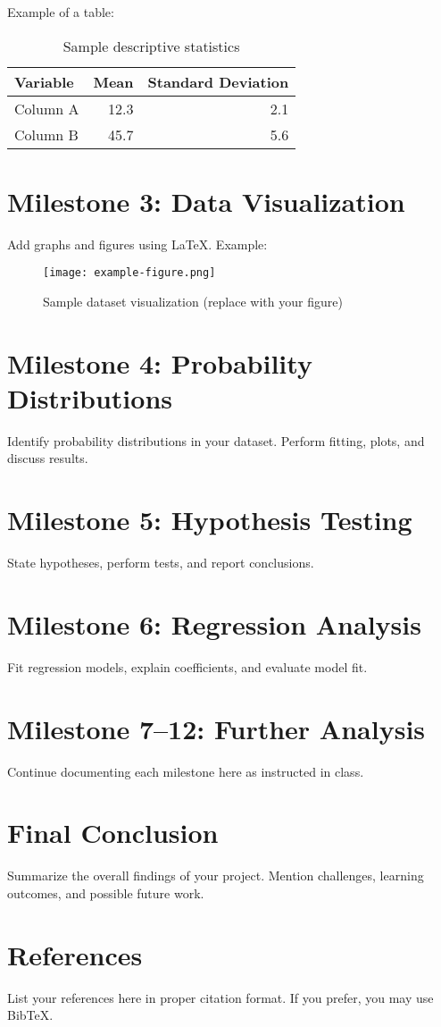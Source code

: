 \documentclass[12pt,a4paper]{article}
\begin{document}
Example of a table:

\begin{table}[h!]
\centering
\begin{tabular}{lrr}
\toprule
Variable & Mean & Standard Deviation \\
\midrule
Column A & 12.3 & 2.1 \\
Column B & 45.7 & 5.6 \\
\bottomrule
\end{tabular}
\caption{Sample descriptive statistics}
\end{table}

\section{Milestone 3: Data Visualization}
Add graphs and figures using LaTeX. Example:

\begin{figure}[h!]
\centering
\texttt{[image: example-figure.png]}
\caption{Sample dataset visualization (replace with your figure)}
\end{figure}

\section{Milestone 4: Probability Distributions}
Identify probability distributions in your dataset. Perform fitting, plots, and discuss results.

\section{Milestone 5: Hypothesis Testing}
State hypotheses, perform tests, and report conclusions.

\section{Milestone 6: Regression Analysis}
Fit regression models, explain coefficients, and evaluate model fit.

\section{Milestone 7--12: Further Analysis}
Continue documenting each milestone here as instructed in class.

\section{Final Conclusion}
Summarize the overall findings of your project. Mention challenges, learning outcomes, and possible future work.

\newpage
\section*{References}
List your references here in proper citation format. If you prefer, you may use BibTeX.
\end{document}
